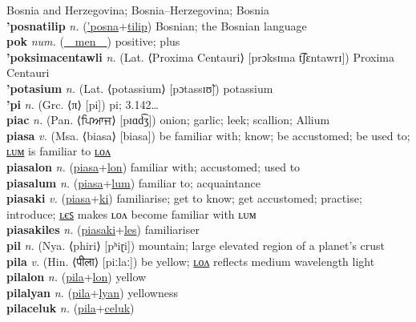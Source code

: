 Bosnia and Herzegovina; Bosnia–Herzegovina; Bosnia \label{'posnatec} \\
\textbf{'posnatilip} \textit{n.} (\hyperref['posna]{'posna}+\hyperref[tilip]{tilip})
Bosnian; the Bosnian language \label{'posnatilip} \\
\textbf{pok} \textit{num.} (\hyperref[men]{~~men~~})
positive; plus \label{pok} \\
\textbf{'poksimacentawli} \textit{n.} (Lat. ⟨Proxima Centauri⟩ [prɔksɪma t͡ʃɛntawrɪ])
Proxima Centauri \label{'poksimacentawli} \\
\textbf{'potasium} \textit{n.} (Lat. ⟨potassium⟩ [pɔtassɪʊ̃])
potassium \label{'potasium} \\
\textbf{'pi} \textit{n.} (Grc. ⟨π⟩ [pi])
pi; 3.142… \label{'pi} \\
\textbf{piac} \textit{n.} (Pan. ⟨ਪਿਆਜ⟩ [pɪɑd͡ʒ])
onion; garlic; leek; scallion; Allium \label{piac} \\
\textbf{piasa} \textit{v.} (Msa. ⟨biasa⟩ [biasa])
be familiar with; know; be accustomed; be used to; \hyperref[piasalum]{ʟᴜᴍ} is familiar to \hyperref[piasalon]{ʟᴏᴧ} \label{piasa} \\
\textbf{piasalon} \textit{n.} (\hyperref[piasa]{piasa}+\hyperref[lon]{lon})
familiar with; accustomed; used to \label{piasalon} \\
\textbf{piasalum} \textit{n.} (\hyperref[piasa]{piasa}+\hyperref[lum]{lum})
familiar to; acquaintance \label{piasalum} \\
\textbf{piasaki} \textit{v.} (\hyperref[piasa]{piasa}+\hyperref[ki]{ki})
familiarise; get to know; get accustomed; practise; introduce; \hyperref[piasakiles]{ʟєꜱ} makes ʟᴏᴧ become familiar with ʟᴜᴍ \label{piasaki} \\
\textbf{piasakiles} \textit{n.} (\hyperref[piasaki]{piasaki}+\hyperref[les]{les})
familiariser \label{piasakiles} \\
\textbf{pil} \textit{n.} (Nya. ⟨phiri⟩ [pʰiɽi])
mountain; large elevated region of a planet’s crust \label{pil} \\
\textbf{pila} \textit{v.} (Hin. ⟨पीला⟩ [piːlaː])
be yellow; \hyperref[pilalon]{ʟᴏᴧ} reflects medium wavelength light \label{pila} \\
\textbf{pilalon} \textit{n.} (\hyperref[pila]{pila}+\hyperref[lon]{lon})
yellow \label{pilalon} \\
\textbf{pilalyan} \textit{n.} (\hyperref[pila]{pila}+\hyperref[lyan]{lyan})
yellowness \label{pilalyan} \\
\textbf{pilaceluk} \textit{n.} (\hyperref[pila]{pila}+\hyperref[celuk]{celuk})
